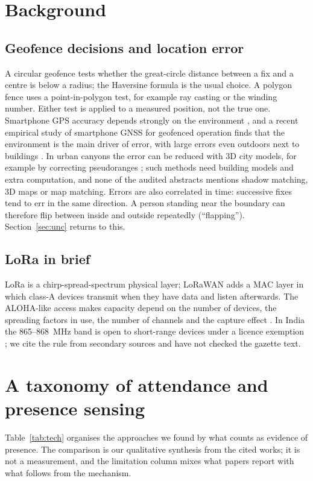 \documentclass[12pt]{article}
\let\cite\citep
\begin{document}
\section{Background}
\subsection{Geofence decisions and location error}
A circular geofence tests whether the great-circle distance between a fix and a centre is below a radius; the Haversine formula \cite{sinnott1984haversine} is the usual choice. A polygon fence uses a point-in-polygon test, for example ray casting or the winding number. Either test is applied to a measured position, not the true one. Smartphone GPS accuracy depends strongly on the environment \cite{zandbergen2009iphone,merry2019smartphone,schipperijn2014dynamic}, and a recent empirical study of smartphone GNSS for geofenced operation finds that the environment is the main driver of error, with large errors even outdoors next to buildings \cite{palathinkal2026evaluating}. In urban canyons the error can be reduced with 3D city models, for example by correcting pseudoranges \cite{miura2015error}; such methods need building models and extra computation, and none of the \nAudit{} audited abstracts mentions shadow matching, 3D maps or map matching. Errors are also correlated in time: successive fixes tend to err in the same direction. A person standing near the boundary can therefore flip between inside and outside repeatedly (``flapping''). Section~\ref{sec:unc} returns to this.

\subsection{LoRa in brief}
LoRa is a chirp-spread-spectrum physical layer; LoRaWAN adds a MAC layer in which class-A devices transmit when they have data and listen afterwards. The ALOHA-like access makes capacity depend on the number of devices, the spreading factors in use, the number of channels and the capture effect \cite{augustin2016lora,haxhibeqiri2018survey,jouhari2023survey}. In India the 865--868~MHz band is open to short-range devices under a licence exemption \cite{dot865}; we cite the rule from secondary sources and have not checked the gazette text.

\section{A taxonomy of attendance and presence sensing}\label{sec:tax}
Table~\ref{tab:tech} organises the approaches we found by what counts as evidence of presence. The comparison is our qualitative synthesis from the cited works; it is not a measurement, and the limitation column mixes what papers report with what follows from the mechanism.
\end{document}
